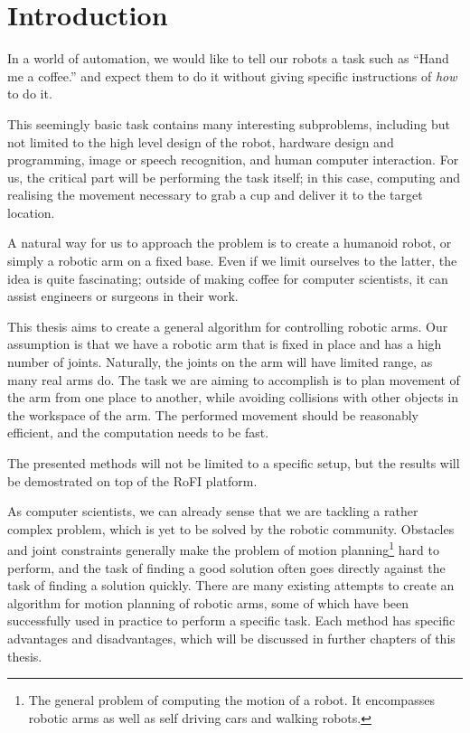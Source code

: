\chapter{Introduction}


In a world of automation, we would like to tell our robots a task such
as \enquote{Hand me a coffee.} and expect them to do it without giving
specific instructions of \textit{how} to do it.

This seemingly basic task contains many interesting subproblems, including but not limited to
the high level design of the robot, hardware design and programming, image or speech recognition, and human computer interaction.
For us, the critical part will be performing the task itself; in this case, computing and realising the movement necessary to grab a cup and deliver it to the target location.

A natural way for us to approach the problem is to create a humanoid robot, or simply a robotic arm on a fixed base. Even if we limit ourselves to the latter, the idea is quite fascinating; outside of making coffee for computer scientists, it can assist engineers or surgeons in their work.

This thesis aims to create a general algorithm for controlling robotic arms.
Our assumption is that we have a robotic arm that is fixed in place and has a high number of joints.
Naturally, the joints on the arm will have limited range, as many real arms do.
The task we are aiming to accomplish is to plan movement of the arm from one place to another, while avoiding collisions with other objects in the workspace of the arm.
The performed movement should be reasonably efficient, and the computation needs to be fast.

The presented methods will not be limited to a specific setup, but the results will be demostrated on top of the RoFI platform\cite{rofiPlatform}.

As computer scientists, we can already sense that we are tackling a rather complex problem, which is yet to be solved by the robotic community. Obstacles and joint constraints generally make the problem of motion planning\footnote{The general problem of computing the motion of a robot. It encompasses robotic arms as well as self driving cars and walking robots.} hard to perform, and the task of finding a good solution often goes directly against the task of finding a solution quickly.
There are many existing attempts to create an algorithm for motion planning of robotic arms,
some of which have been successfully used in practice to perform a specific task. Each method has specific advantages and disadvantages, which will be discussed in further chapters of this thesis.

